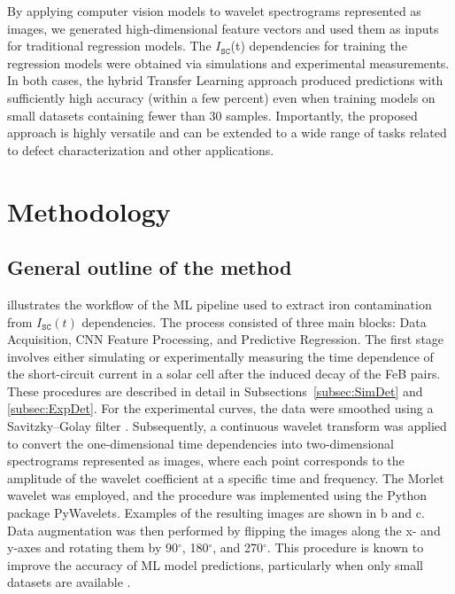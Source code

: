 \documentclass[10pt]{iopart}
\begin{document}
By applying computer vision models to wavelet spectrograms represented as images, we generated high-dimensional feature vectors and used them as inputs for traditional regression models.
The $I_\mathtt{SC}$(t) dependencies for training the regression models were obtained via simulations and experimental measurements.
In both cases, the hybrid Transfer Learning approach produced predictions with sufficiently high accuracy (within a few percent) even when training models
on small datasets containing fewer than 30 samples.
Importantly, the proposed approach is highly versatile and can be extended to a wide range of tasks related to defect characterization and other applications.


\section{Methodology}\label{sec:Exp}

\subsection{General outline of the method}\label{subsec:GenSch}

 illustrates the workflow of the ML pipeline used to extract iron contamination from $I_\mathtt{SC}(t)$ dependencies.
The process consisted of three main blocks: Data Acquisition, CNN Feature Processing, and Predictive Regression.
The first stage involves either simulating or experimentally measuring the time dependence
of the short-circuit current in a solar cell after the induced decay of the FeB pairs.
These procedures are described in detail in Subsections~\ref{subsec:SimDet} and \ref{subsec:ExpDet}.
For the experimental curves, the data were smoothed using a Savitzky–Golay filter \cite{Krishnan2013}.
Subsequently, a continuous wavelet transform \cite{Torrence1998} was applied to convert the one-dimensional time dependencies
into two-dimensional spectrograms represented as images,
where each point corresponds to the amplitude of the wavelet coefficient at a specific time and frequency.
The Morlet wavelet was employed, and the procedure was implemented using the Python package PyWavelets.
Examples of the resulting images are shown in b and c.
Data augmentation was then performed by flipping the images along the x- and y-axes and rotating them by 90$^{\circ}$, 180$^{\circ}$, and 270$^{\circ}$.
This procedure is known to improve the accuracy of ML model predictions, particularly when only small datasets are available \cite{Ahmad2020}.
\end{document}
